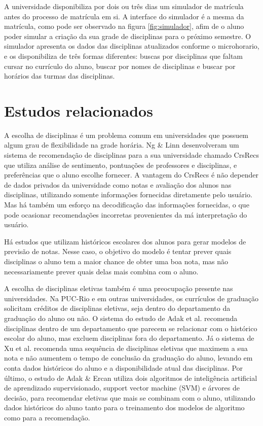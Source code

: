 A universidade disponibiliza por dois ou três dias um simulador de matrícula  antes do processo de matrícula em si. A interface do simulador é a mesma da matrícula, como pode ser observado na figura \ref{fig:simulador}, 
afim de o aluno poder simular a criação da sua grade de disciplinas para o próximo semestre. O simulador apresenta os dados das disciplinas atualizados conforme o microhorario, e os disponibiliza de três formas diferentes: buscas por disciplinas que faltam cursar no currículo do aluno, buscar por nomes de disciplinas e buscar por horários das turmas das 
disciplinas.\cite{doc-matricula}



\section{Estudos relacionados}

A escolha de disciplinas é um problema comum em universidades que possuem algum grau de flexibilidade na grade horária. Ng \& Linn\cite{crs-recs} desenvolveram um sistema de recomendação de disciplinas para a sua universidade chamado CrsRecs que utiliza análise de sentimento, pontuações de professores e disciplinas, e preferências que o aluno escolhe fornecer. A vantagem do CrsRecs é não depender de dados privados da universidade como notas e avaliação dos alunos nas disciplinas, utilizando somente informações fornecidas diretamente pelo usuário. Mas há também um esforço na decodificação das informações fornecidas, o que pode ocasionar recomendações incorretas provenientes da má interpretação do usuário.

Há estudos que utilizam históricos escolares dos alunos para gerar modelos de previsão de notas.\cite{rani-machine-learning,nguyen-learning-outcome,adak-fuzzy} Nesse caso, o objetivo do modelo é tentar prever quais disciplinas o aluno tem a maior chance de obter uma boa nota, mas não necessariamente prever quais delas mais combina com o aluno.\cite{rani-machine-learning,nguyen-learning-outcome}

A escolha de disciplinas eletivas também é uma preocupação presente nas universidades. Na PUC-Rio e em outras universidades, os currículos de graduação solicitam créditos de disciplinas eletivas, seja dentro do departamento da graduação do aluno ou não. O sistema do estudo de Adak et al.\cite{adak-fuzzy} recomenda disciplinas dentro de um departamento que parecem se relacionar com o histórico escolar do aluno, mas excluem disciplinas fora do departamento.
Já o sistema de Xu et al.\cite{xu-personalizado} recomenda uma sequência de disciplinas eletivas que maximem a sua nota e não aumentem o tempo de conclusão da graduação do aluno, levando em conta dados históricos do aluno e a disponibilidade atual das disciplinas. 
Por último, o estudo de Adak \& Ercan\cite{adak-svm} utiliza dois algoritmos de inteligência artificial de aprendizado supervisionado, support vector machine (SVM) e árvores de decisão, para recomendar eletivas que mais se combinam com o aluno, utilizando dados históricos do aluno tanto para o treinamento dos modelos de algoritmo como para a recomendação.

